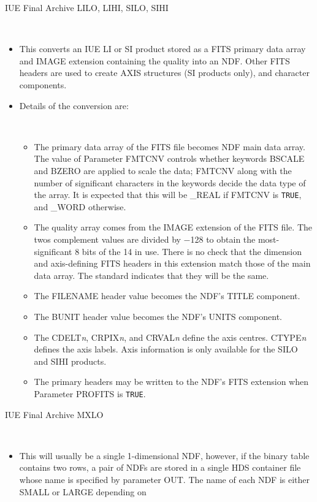 \documentclass[twoside,11pt]{article}
\newcommand{\htmladdnormallink}[2]{#1}
\newcommand{\latex}[1]{#1}
\newcommand{\ssthitemlist}[1]{
  \latex{
  \mbox{} \\
  \vspace{-3.5ex}
  }
  \begin{itemize}
     #1
  \end{itemize}
}
\newcommand{\sstitem}{\item}
\newcommand{\sstitem}{\item}
\begin{document}
{{{         \bigskip
         \sstitem
         \htmladdnormallink{IUE Final Archive}{http://www.vilspa.esa.es/iue/iuefa.html}
         LILO, LIHI, SILO, SIHI
         \ssthitemlist{
            \sstitem
            This converts an IUE LI or SI product stored as a FITS primary
            data array and IMAGE extension containing the quality into an
            NDF.  Other FITS headers are used to create AXIS structures (SI
            products only), and character components.
            \sstitem
            Details of the conversion are:
            \ssthitemlist{
               \sstitem
               The primary data array of the FITS file becomes NDF main
               data array.  The value of Parameter FMTCNV controls whether
               keywords BSCALE and BZERO are applied to scale the data;
               FMTCNV along with the number of significant characters in the
               keywords decide the data type of the array.  It is expected
               that this will be \_REAL if FMTCNV is \texttt{TRUE}, and \_WORD
               otherwise.
               \sstitem
               The quality array comes from the IMAGE extension of the
               FITS file.  The twos complement values are divided by $-$128 to
               obtain the most-significant 8 bits of the 14 in use.  There is
               no check that the dimension and axis-defining FITS headers in
               this extension match those of the main data array.  The
               standard indicates that they will be the same.
               \sstitem
               The FILENAME header value becomes the NDF's TITLE component.
               \sstitem
               The BUNIT header value becomes the NDF's UNITS component.
               \sstitem
               The CDELT\textit{n}, CRPIX\textit{n}, and CRVAL\textit{n} 
               define the axis centres.
               CTYPE\textit{n} defines the axis labels.  
               Axis information is only available for the SILO and SIHI 
               products.
               \sstitem
               The primary headers may be written to the NDF's FITS
               extension when Parameter PROFITS is \texttt{TRUE}.
            }
         }
         \bigskip
         \pagebreak[2]
         \sstitem
         IUE Final Archive MXLO
         \ssthitemlist{
            \sstitem
            This will usually be a single 1-dimensional NDF, however, if
            the binary table contains two rows, a pair of NDFs are stored in
            a single HDS container file whose name is specified by parameter
            OUT.  The name of each NDF is either SMALL or LARGE depending on
}}}}
\end{document}
